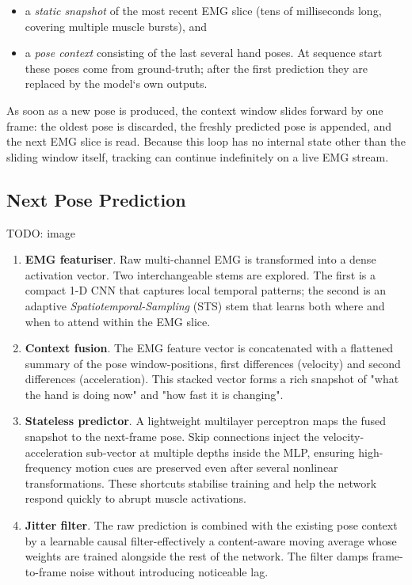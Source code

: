 \begin{itemize}
  \item a \emph{static snapshot} of the most recent EMG slice
        (tens of milliseconds long, covering multiple muscle bursts), and
  \item a \emph{pose context} consisting of the last several hand poses.
        At sequence start these poses come from ground-truth; after the first
        prediction they are replaced by the model`s own outputs.
\end{itemize}

As soon as a new pose is produced, the context window slides forward by one
frame: the oldest pose is discarded, the freshly predicted pose is appended,
and the next EMG slice is read.
Because this loop has no internal state other than the sliding window itself,
tracking can continue indefinitely on a live EMG stream.

\subsection{Next Pose Prediction}

TODO: image

\begin{enumerate}[label=\arabic*.]
  \item \textbf{EMG featuriser}.
        Raw multi-channel EMG is transformed into a dense activation vector.
        Two interchangeable stems are explored.
        The first is a compact 1-D CNN that captures local temporal patterns;
        the second is an adaptive \emph{Spatiotemporal-Sampling} (STS) stem that
        learns both where and when to attend within the EMG slice.
  \item \textbf{Context fusion}.
        The EMG feature vector is concatenated with a flattened summary of the
        pose window-positions, first differences (velocity) and second
        differences (acceleration). This stacked vector forms a rich snapshot
        of "what the hand is doing now" and "how fast it is changing".
  \item \textbf{Stateless predictor}.
        A lightweight multilayer perceptron maps the fused snapshot to the
        next-frame pose. Skip connections inject the velocity-acceleration
        sub-vector at multiple depths inside the MLP, ensuring high-frequency
        motion cues are preserved even after several nonlinear transformations.
        These shortcuts stabilise training and help the network respond quickly
        to abrupt muscle activations.
  \item \textbf{Jitter filter}.
        The raw prediction is combined with the existing pose context by a
        learnable causal filter-effectively a content-aware moving average
        whose weights are trained alongside the rest of the network. The
        filter damps frame-to-frame noise without introducing noticeable lag.
\end{enumerate}

